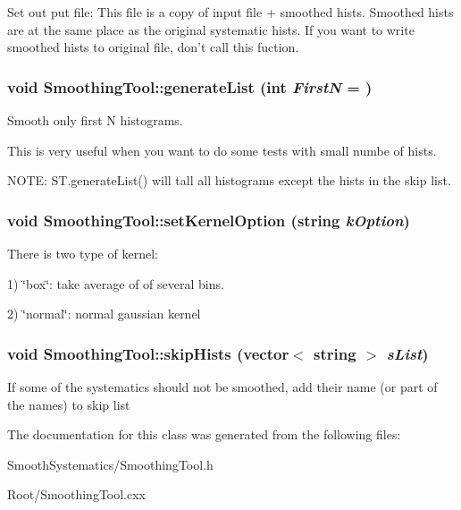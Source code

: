 \label{classSmoothingTool_acebcdc9de5c01a9e5a4fae7253f4fa7b}
Set out put file: This file is a copy of input file + smoothed hists. Smoothed hists are at the same place as the original systematic hists. If you want to write smoothed hists to original file, don't call this fuction. \hypertarget{classSmoothingTool_a980fda8c4c47dac4db2347e51ec435cd}{
\subsubsection[{generateList}]{\setlength{\rightskip}{0pt plus 5cm}void SmoothingTool::generateList (int {\em FirstN} = {})}}
\label{classSmoothingTool_a980fda8c4c47dac4db2347e51ec435cd}
Smooth only first N histograms.\par
 This is very useful when you want to do some tests with small numbe of hists.\par
 NOTE: ST.generateList() will tall all histograms except the hists in the skip list. \hypertarget{classSmoothingTool_ae66c92826009ac6afe84a383ca74e4a7}{
\subsubsection[{setKernelOption}]{\setlength{\rightskip}{0pt plus 5cm}void SmoothingTool::setKernelOption (string {\em kOption})}}
\label{classSmoothingTool_ae66c92826009ac6afe84a383ca74e4a7}
There is two type of kernel:\par
 1) \char`\"{}box\char`\"{}: take average of of several bins.\par
 2) \char`\"{}normal\char`\"{}: normal gaussian kernel\par
 \hypertarget{classSmoothingTool_a28efec9f77ecd383a7a3209dfad43cf0}{
\subsubsection[{skipHists}]{\setlength{\rightskip}{0pt plus 5cm}void SmoothingTool::skipHists (vector$<$ string $>$ {\em sList})}}
\label{classSmoothingTool_a28efec9f77ecd383a7a3209dfad43cf0}
If some of the systematics should not be smoothed, add their name (or part of the names) to skip list 

The documentation for this class was generated from the following files:\begin{DoxyCompactItemize}
\item 
SmoothSystematics/SmoothingTool.h\item 
Root/SmoothingTool.cxx\end{DoxyCompactItemize}
